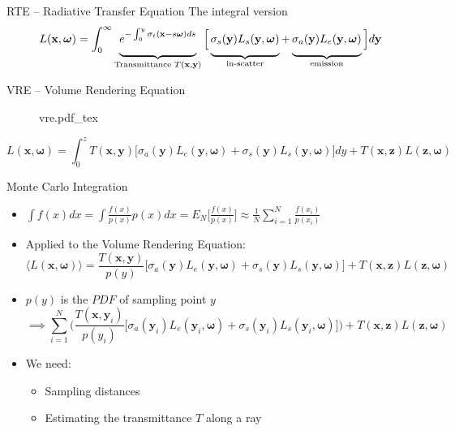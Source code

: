 \documentclass[
  english,            %
  aspectratio=169,    %
]{tumbeamer}
\newcommand\bx[0]{\textbf{x}}
\newcommand\by[0]{\textbf{y}}
\newcommand\bomega[0]{\boldsymbol{\omega}}
\newcommand*\mystrut[1]{\vrule width0pt height0pt depth#1\relax}
\newcommand{\incfig}[1]{%
    \def\svgwidth{\columnwidth}
    {#1.pdf_tex}
}
\begin{document}
\begin{frame}{RTE -- Radiative Transfer Equation}
    {The integral version}
    \vfill
    \vfill
    \begin{equation}
        L(\bx, \bomega) = \int_0^\infty 
        \underbrace{\mystrut{2ex}
            e^{-\int_0^y{\sigma_t(\bx-s\bomega)}ds}
        }_{\text{Transmittance } T(\bx, \by)}
        \Big[
            \underbrace{\mystrut{2ex}
                \sigma_s(\by)L_s(\by, \bomega)
            }_{\text{in-scatter}}
            + 
            \underbrace{\mystrut{2ex}
                \sigma_a(\by)L_e(\by, \bomega)
            }_{\text{emission}}
        \Big]
        d\by
    \end{equation}
    \vfill
\end{frame}

\begin{frame}{VRE -- Volume Rendering Equation}
    \begin{figure}[ht]
        \centering
        \incfig{vre}
        \label{fig:vre}
    \end{figure}
    \begin{equation}
    L(\bx, \bomega) = \int_{0}^{z} 
        T(\bx, \by)
        \big[ 
            \sigma_a(\by)L_e(\by, \bomega) + 
            \sigma_s(\by)L_s(\by, \bomega)
        \big] dy
        + 
        T(\bx, \textbf{z})L(\textbf{z},\bomega)
    \end{equation}
\end{frame}

\begin{frame}{Monte Carlo Integration}
\begin{itemize}
    \item $\int f(x)dx = \int \frac{f(x)}{p(x)}p(x) dx 
        = E_N\Big[ \frac{f(x)}{p(x)} \Big]
        \approx \frac{1}{N} \sum\limits_{i=1}^N \frac{f(x_i)}{p(x_i)}$
    \item Applied to the Volume Rendering Equation:
    $$\langle L(\bx, \bomega) \rangle = 
        \frac{T(\bx, \by)}{p(y)}
        \big[ 
            \sigma_a(\by)L_e(\by, \bomega) + 
            \sigma_s(\by)L_s(\by, \bomega)
        \big] 
        + 
        T(\bx, \textbf{z})L(\textbf{z},\bomega)$$
    \item $p(y)$ is the $PDF$ of sampling point $y$
        $$\implies
         \sum\limits_{i=1}^N \Big(
        \frac{T(\bx, \by_i)}{p(y_i)}
        \big[ 
            \sigma_a(\by_i)L_e(\by_i, \bomega) + 
            \sigma_s(\by_i)L_s(\by_i, \bomega)
        \big] \Big)
        + 
        T(\bx, \textbf{z})L(\textbf{z},\bomega)
        $$
    \item We need:
        \begin{itemize}
            \item Sampling distances
            \item Estimating the transmittance $T$ along a ray
        \end{itemize}
\end{itemize}
\end{frame}
\end{document}
